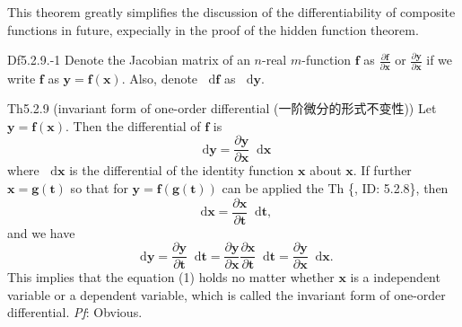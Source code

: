 \documentclass{article}
\newcommand{\parfrac}[2]{\frac{\partial #1}{\partial #2}}
\newcommand{\dif}{\mathop{}\!\mathrm{d}}
\begin{document}
\begin{Rmk}{}
    This theorem greatly simplifies the discussion of the differentiability of composite functions in future, expecially in the proof of the hidden function theorem.
\end{Rmk}

\begin{Df}{Df5.2.9.-1}
    Denote the Jacobian matrix of an $n$-real $m$-function $\pmb{f}$ as $\parfrac{\pmb{f}}{\pmb{x}}$ or $\parfrac{\pmb{y}}{\pmb{x}}$ if we write $\pmb{f}$ as $\pmb{y} = \pmb{f}(\pmb{x})$. Also, denote $\dif\pmb{f}$ as $\dif\pmb{y}$.
\end{Df}

\begin{Th}{Th5.2.9 (invariant form of one-order differential (一阶微分的形式不变性))}
    Let $\pmb{y} = \pmb{f}(\pmb{x})$. Then the differential of $\pmb{f}$ is
    \begin{equation}
        \dif\pmb{y} = \parfrac{\pmb{y}}{\pmb{x}}\dif\pmb{x}
        \tag{1}
    \end{equation}
    where $\dif\pmb{x}$ is the differential of the identity function $\pmb{x}$ about $\pmb{x}$.
    If further $\pmb{x} = \pmb{g}(\pmb{t})$ so that for $\pmb{y} = \pmb{f}(\pmb{g}(\pmb{t}))$ can be applied the Th \{, ID: 5.2.8\}, then
    $$ \dif\pmb{x} = \parfrac{\pmb{x}}{\pmb{t}}\dif\pmb{t}, $$
    and we have
    $$ \dif\pmb{y} = \parfrac{\pmb{y}}{\pmb{t}}\dif\pmb{t} = \parfrac{\pmb{y}}{\pmb{x}}\parfrac{\pmb{x}}{\pmb{t}}\dif\pmb{t} = \parfrac{\pmb{y}}{\pmb{x}}\dif\pmb{x}. $$
    This implies that the equation (1) holds no matter whether $\pmb{x}$ is a independent variable or a dependent variable, \textcolor{Df}{which is called the invariant form of one-order differential.}
    \tcblower
    \textit{Pf}: Obvious.
\end{Th}
\end{document}
